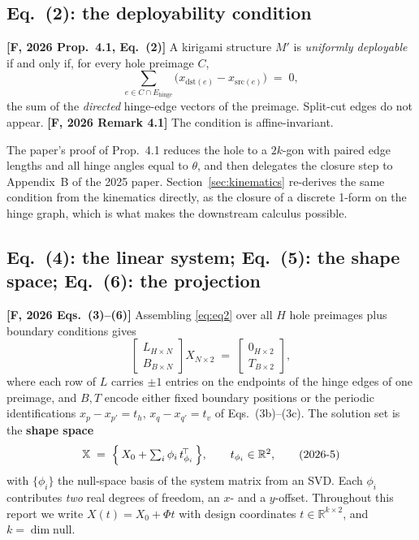 \documentclass[11pt,a4paper]{article}
\theoremstyle{definition}
\newcommand{\Ehinge}{E_{\mathrm{hinge}}}
\newcommand{\Mprime}{M'}
\begin{document}
\subsection{Eq.~(2): the deployability condition}

\textbf{[F, 2026 Prop.~4.1, Eq.~(2)]} A kirigami structure $\Mprime$ is \emph{uniformly
deployable} if and only if, for every hole preimage $C$,
\begin{equation}
\sum_{e\in C\cap\Ehinge} \bigl(x_{\mathrm{dst}(e)}-x_{\mathrm{src}(e)}\bigr) \;=\; 0 ,
\tag{2026-2}
\label{eq:eq2}
\end{equation}
the sum of the \emph{directed} hinge-edge vectors of the preimage. Split-cut edges do not
appear. \textbf{[F, 2026 Remark 4.1]} The condition is affine-invariant.

The paper's proof of Prop.~4.1 reduces the hole to a $2k$-gon with paired edge lengths and
all hinge angles equal to $\theta$, and then delegates the closure step to Appendix~B of the
2025 paper. Section~\ref{sec:kinematics} re-derives the same condition from the kinematics
directly, as the closure of a discrete 1-form on the hinge graph, which is what makes the
downstream calculus possible.

\subsection{Eq.~(4): the linear system; Eq.~(5): the shape space; Eq.~(6): the projection}

\textbf{[F, 2026 Eqs.~(3)--(6)]} Assembling \eqref{eq:eq2} over all $H$ hole preimages plus
boundary conditions gives
\begin{equation}
\begin{bmatrix} L_{H\times N}\\ B_{B\times N}\end{bmatrix} X_{N\times2}
\;=\;
\begin{bmatrix} 0_{H\times2}\\ T_{B\times2}\end{bmatrix},
\tag{2026-4}
\label{eq:eq4}
\end{equation}
where each row of $L$ carries $\pm1$ entries on the endpoints of the hinge edges of one
preimage, and $B,T$ encode either fixed boundary positions or the periodic identifications
$x_p-x_{p'}=t_h$, $x_q-x_{q'}=t_v$ of Eqs.~(3b)--(3c). The solution set is the
\textbf{shape space}
\begin{equation}
\mathbb{X} \;=\; \Bigl\{\, X_0+\textstyle\sum_i \phi_i\, t_{\phi_i}^{\!\top} \,\Bigr\},
\qquad t_{\phi_i}\in\mathbb{R}^2,
\tag{2026-5}
\label{eq:eq5}
\end{equation}
with $\{\phi_i\}$ the null-space basis of the system matrix from an SVD. Each $\phi_i$
contributes \emph{two} real degrees of freedom, an $x$- and a $y$-offset. Throughout this
report we write $X(t)=X_0+\Phi t$ with design coordinates $t\in\mathbb{R}^{k\times2}$, and
$k=\dim\mathrm{null}$.
\end{document}
